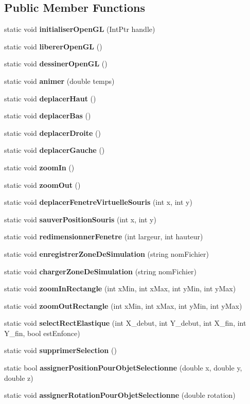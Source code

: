 \subsection*{Public Member Functions}
\begin{DoxyCompactItemize}
\item 
static void {\bfseries initialiser\+Open\+GL} (Int\+Ptr handle)
\item 
static void {\bfseries liberer\+Open\+GL} ()
\item 
static void {\bfseries dessiner\+Open\+GL} ()
\item 
static void {\bfseries animer} (double temps)
\item 
static void {\bfseries deplacer\+Haut} ()
\item 
static void {\bfseries deplacer\+Bas} ()
\item 
static void {\bfseries deplacer\+Droite} ()
\item 
static void {\bfseries deplacer\+Gauche} ()
\item 
static void {\bfseries zoom\+In} ()
\item 
static void {\bfseries zoom\+Out} ()
\item 
static void {\bfseries deplacer\+Fenetre\+Virtuelle\+Souris} (int x, int y)
\item 
static void {\bfseries sauver\+Position\+Souris} (int x, int y)
\item 
static void {\bfseries redimensionner\+Fenetre} (int largeur, int hauteur)
\item 
static void {\bfseries enregistrer\+Zone\+De\+Simulation} (string nom\+Fichier)
\item 
static void {\bfseries charger\+Zone\+De\+Simulation} (string nom\+Fichier)
\item 
static void {\bfseries zoom\+In\+Rectangle} (int x\+Min, int x\+Max, int y\+Min, int y\+Max)
\item 
static void {\bfseries zoom\+Out\+Rectangle} (int x\+Min, int x\+Max, int y\+Min, int y\+Max)
\item 
static void {\bfseries select\+Rect\+Elastique} (int X\+\_\+debut, int Y\+\_\+debut, int X\+\_\+fin, int Y\+\_\+fin, bool est\+Enfonce)
\item 
static void {\bfseries supprimer\+Selection} ()
\item 
static bool {\bfseries assigner\+Position\+Pour\+Objet\+Selectionne} (double x, double y, double z)
\item 
static void {\bfseries assigner\+Rotation\+Pour\+Objet\+Selectionne} (double rotation)

\end{DoxyCompactItemize}

